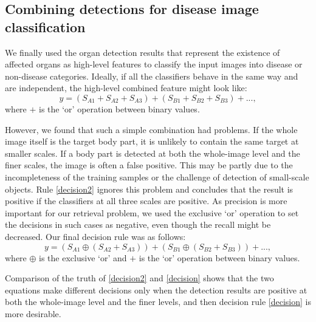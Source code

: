 \subsection{Combining detections for disease image classification}
We finally used the organ detection results that represent the
existence of affected organs as high-level features to classify the
input images into disease or non-disease categories. Ideally, if all
the classifiers behave in the same way and are independent, the
high-level combined feature might look like:
\begin{equation}\label{decision2}
y = ({S_{A1}} + {S_{A2}} + {S_{A3}}) + ({S_{B1}} + {S_{B2}} + {S_{B3}}) + ...,
\end{equation}
where $+$ is the `or' operation between binary values.

However, we found that such a simple combination had problems.
If the whole image itself is the target body part, it is
unlikely to contain the same target at smaller scales. If a body
part is detected at both the whole-image level and the finer
scales, the image is often a false positive. This may be partly due
to the incompleteness of the training samples or the challenge
of detection of small-scale objects. Rule \eqref{decision2} ignores this problem
and concludes that the result is positive if the classifiers at all
three scales are positive. As precision is more important for our
retrieval problem, we used the exclusive `or' operation to set
the decisions in such cases as negative, even though the recall
might be decreased.
Our final decision rule was as follows:
\begin{equation}\label{decision}
y = ({S_{A1}} \oplus ({S_{A2}} + {S_{A3}})) + ({S_{B1}} \oplus ({S_{B2}} + {S_{B3}})) + ...,
\end{equation}
where $\oplus$ is the exclusive `or' and $+$ is the `or' operation between binary values.

Comparison of the truth of \eqref{decision2} and \eqref{decision}
shows that the two equations make different decisions only
when the detection results are positive at both the whole-image
level and the finer levels, and then decision rule \eqref{decision} is more
desirable.




